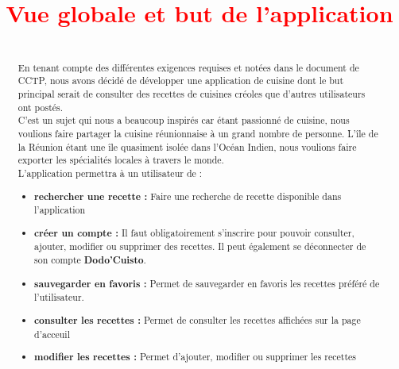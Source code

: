 \documentclass{article}
\begin{document}
\begin{abstract}

\title{\textcolor{red}{Vue globale et but de l’application}}\\

En tenant compte des différentes exigences requises et notées dans le document de CCTP, nous avons décidé de développer une application de cuisine dont le but principal serait de consulter des recettes de cuisines créoles que d’autres utilisateurs ont postés.\\

C’est un sujet qui nous a beaucoup inspirés car étant passionné de cuisine, nous voulions faire partager la cuisine réunionnaise à un grand nombre de personne. L’île de la Réunion étant une île quasiment isolée dans l’Océan Indien, nous voulions faire exporter les spécialités locales à travers le monde.\\ 

L’application permettra à un utilisateur de :
\begin{itemize}
    \item \textbf{rechercher une recette :} Faire une recherche de recette disponible dans l’application
    \item \textbf{créer un compte :} Il faut obligatoirement s’inscrire pour pouvoir consulter, ajouter, modifier ou supprimer des recettes. Il peut également se déconnecter de son compte \textbf{Dodo’Cuisto}.
    \item \textbf{sauvegarder en favoris :} Permet de sauvegarder en favoris les recettes préféré de l’utilisateur.
    \item \textbf{consulter les recettes :} Permet de consulter les recettes affichées sur la page d’acceuil
    \item \textbf{modifier les recettes :} Permet d’ajouter, modifier ou supprimer les recettes
\end{itemize}

\end{abstract}

\newpage


\tableofcontents

\end{document}
